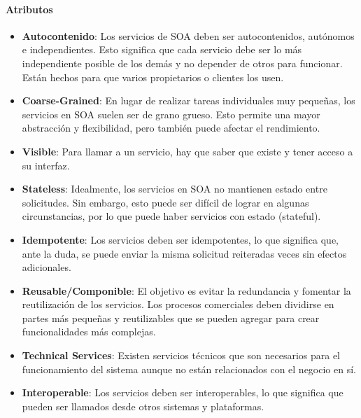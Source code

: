 \documentclass{article}
\begin{document}
		\paragraph{Atributos}
			\begin{itemize}		
				\item \textbf{Autocontenido}: Los servicios de SOA deben ser autocontenidos, autónomos e independientes. Esto significa que cada servicio debe ser lo más independiente posible de los demás y no depender de otros para funcionar. Están hechos para que varios propietarios o clientes los usen.
								
				\item \textbf{Coarse-Grained}: En lugar de realizar tareas individuales muy pequeñas, los servicios en SOA suelen ser de grano grueso. Esto permite una mayor abstracción y flexibilidad, pero también puede afectar el rendimiento.
					
				\item \textbf{Visible}: Para llamar a un servicio, hay que saber que existe y tener acceso a su interfaz.
				
				\item \textbf{Stateless}: Idealmente, los servicios en SOA no mantienen estado entre solicitudes. Sin embargo, esto puede ser difícil de lograr en algunas circunstancias, por lo que puede haber servicios con estado (stateful).
				
				\item \textbf{Idempotente}: Los servicios deben ser idempotentes, lo que significa que, ante la duda, se puede enviar la misma solicitud reiteradas veces sin efectos adicionales.
				
				\item \textbf{Reusable/Componible}: El objetivo es evitar la redundancia y fomentar la reutilización de los servicios. Los procesos comerciales deben dividirse en partes más pequeñas y reutilizables que se pueden agregar para crear funcionalidades más complejas.
				
				\item \textbf{Technical Services}: Existen servicios técnicos que son necesarios para el funcionamiento del sistema aunque no están relacionados con el negocio en sí.
								
				\item \textbf{Interoperable}: Los servicios deben ser interoperables, lo que significa que pueden ser llamados desde otros sistemas y plataformas.
				
			\end{itemize}
		
\end{document}
